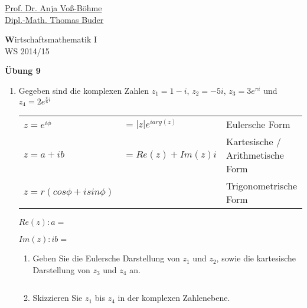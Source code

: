 \documentclass[12pt,a4paper]{scrreprt}
\begin{document}
 
\begin{flushleft}
\href{mailto:anja.voss-boehme@htw-dresden.de}{Prof. Dr. Anja Voß-Böhme} \\
\href{mailto:buder@htw-dresden.de}{Dipl.-Math. Thomas Buder}
\end{flushleft}

\begin{center}{\large\textbf Wirtschaftsmathematik I} \\ WS 2014/15 \end{center}

\begin{center}{\large\textbf{Übung 9} } 
\end{center}


\bigskip

\begin{enumerate}
	\item Gegeben sind die komplexen Zahlen
	$ z_1 = 1- i $,
	$z_2 = -5 i $,
	$z_3 = 3e^{ \pi i }$ und
	$z_4 = 2e^{ \frac{\pi}{6} i }$

\begin{tabular}{lll}
$ z=e^{i \phi}$ &$= |z| e^{i arg(z)}$ & Eulersche Form \\
$ z= a + i b$ &$= Re(z) + Im(z)  i $ & Kartesische / Arithmetische Form \\
$ z=r(cos \phi + i sin \phi) $ & & Trigonometrische Form
\end{tabular}

$Re(z):  a= $

$Im(z):  i b= $



	\begin{enumerate}
	
		\item Geben Sie die Eulersche Darstellung von $z_1$ und $z_2$, sowie die kartesische Darstellung von $z_3$ und $z_4$ an.


\[
\]

		\item Skizzieren Sie $z_1$ bis $z_4$ in der komplexen Zahlenebene.


\end{enumerate}
\end{enumerate}
\end{document}
